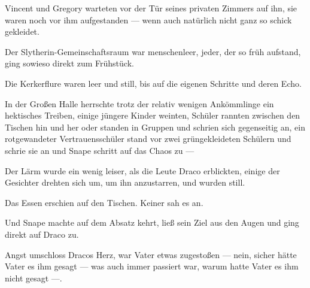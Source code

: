 Vincent und Gregory warteten vor der Tür seines privaten Zimmers auf ihn, sie waren noch vor ihm aufgestanden — wenn auch natürlich nicht ganz so schick gekleidet.

Der Slytherin-Gemeinschaftsraum war menschenleer, jeder, der so früh aufstand, ging sowieso direkt zum Frühstück.

Die Kerkerflure waren leer und still, bis auf die eigenen Schritte und deren Echo.

In der Großen Halle herrschte trotz der relativ wenigen Ankömmlinge ein hektisches Treiben, einige jüngere Kinder weinten, Schüler rannten zwischen den Tischen hin und her oder standen in Gruppen und schrien sich gegenseitig an, ein rotgewandeter Vertrauensschüler stand vor zwei grüngekleideten Schülern und schrie sie an und Snape schritt auf das Chaos zu —

Der Lärm wurde ein wenig leiser, als die Leute Draco erblickten, einige der Gesichter drehten sich um, um ihn anzustarren, und wurden still.

Das Essen erschien auf den Tischen. Keiner sah es an.

Und Snape machte auf dem Absatz kehrt, ließ sein Ziel aus den Augen und ging direkt auf Draco zu.

Angst umschloss Dracos Herz, war Vater etwas zugestoßen — nein, sicher hätte Vater es ihm gesagt — was auch immer passiert war, warum hatte Vater es ihm nicht gesagt —.

